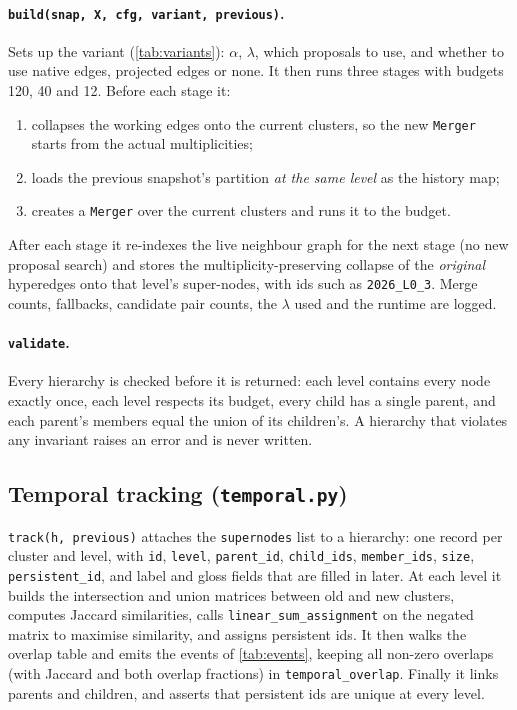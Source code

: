 \documentclass[11pt,a4paper]{article}
\newcommand{\cref}[1]{\autoref{#1}}
\theoremstyle{remark}
\newcommand{\code}[1]{\texttt{\small #1}}
\begin{document}
\paragraph{\code{build(snap, X, cfg, variant, previous)}.}
Sets up the variant (\cref{tab:variants}): $\alpha$, $\lambda$, which proposals to use,
and whether to use native edges, projected edges or none. It then runs three stages with
budgets 120, 40 and 12. Before each stage it:
\begin{enumerate}
  \item collapses the working edges onto the current clusters, so the new \code{Merger}
        starts from the actual multiplicities;
  \item loads the previous snapshot's partition \emph{at the same level} as the history map;
  \item creates a \code{Merger} over the current clusters and runs it to the budget.
\end{enumerate}
After each stage it re-indexes the live neighbour graph for the next stage (no new
proposal search) and stores the multiplicity-preserving collapse of the \emph{original}
hyperedges onto that level's super-nodes, with ids such as \code{2026\_L0\_3}. Merge
counts, fallbacks, candidate pair counts, the $\lambda$ used and the runtime are logged.

\paragraph{\code{validate}.}
Every hierarchy is checked before it is returned: each level contains every node exactly
once, each level respects its budget, every child has a single parent, and each parent's
members equal the union of its children's. A hierarchy that violates any invariant raises
an error and is never written.

\subsection{Temporal tracking (\code{temporal.py})}

\code{track(h, previous)} attaches the \code{supernodes} list to a hierarchy: one record per
cluster and level, with \code{id}, \code{level}, \code{parent\_id}, \code{child\_ids},
\code{member\_ids}, \code{size}, \code{persistent\_id}, and label and gloss fields that are
filled in later. At each level it builds the intersection and union matrices between old
and new clusters, computes Jaccard similarities, calls \code{linear\_sum\_assignment} on the
negated matrix to maximise similarity, and assigns persistent ids. It then walks the overlap
table and emits the events of \cref{tab:events}, keeping all non-zero overlaps (with
Jaccard and both overlap fractions) in \code{temporal\_overlap}. Finally it links parents and
children, and asserts that persistent ids are unique at every level.
\end{document}
